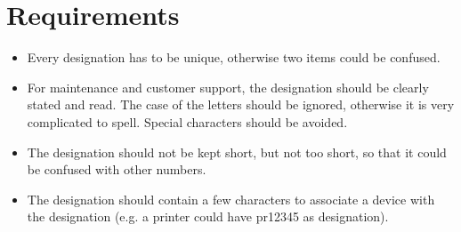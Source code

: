 %
%
%
%
%
%
%

\section{Requirements}

\begin{itemize}
	\item Every designation has to be unique, otherwise two items could be
		confused.

	\item For maintenance and customer support, the designation should be
		clearly stated and read. The case of the letters should be ignored,
		otherwise it is very complicated to spell. Special characters should be
		avoided.

	\item The designation should not be kept short, but not too short, so that
		it could be confused with other numbers.

	\item The designation should contain a few characters to associate a device
		with the designation (e.g. a printer could have pr12345 as designation).
\end{itemize}
